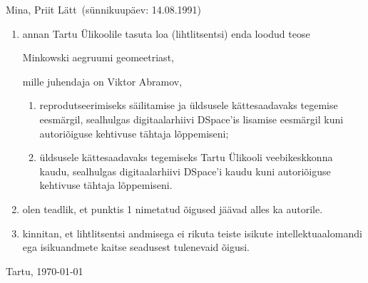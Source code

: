 \documentclass[12pt,a4paper,oneside]{article}
\theoremstyle{plain}
\theoremstyle{definition}
\numberwithin{equation}{section}
\def\title{Minkowski aegruumi geomeetriast}
\def\author{Priit Lätt}
\begin{document}
Mina, \author\ (sünnikuupäev: 14.08.1991)
\begin{enumerate}
	\item annan Tartu Ülikoolile tasuta loa (lihtlitsentsi) 
	enda loodud teose
	\begin{center}
	\title,
	\end{center}
	mille juhendaja on Viktor Abramov,
	\begin{enumerate}
		\item reprodutseerimiseks säilitamise ja üldsusele 
		kättesaadavaks tegemise eesmärgil, sealhulgas 
		digitaalarhiivi DSpace'is lisamise eesmärgil kuni 
		autoriõiguse kehtivuse tähtaja lõppemiseni;
		\item üldsusele kättesaadavaks tegemiseks Tartu Ülikooli 
		veebikeskkonna kaudu, sealhulgas digitaalarhiivi 
		DSpace'i kaudu kuni autoriõiguse kehtivuse tähtaja lõppemiseni.
	\end{enumerate}
	\item olen teadlik, et punktis 1 nimetatud õigused jäävad 
	alles ka autorile.
	\item kinnitan, et lihtlitsentsi andmisega ei rikuta teiste 
	isikute intellektuaalomandi ega isikuandmete kaitse 
	seadusest tulenevaid õigusi.
\end{enumerate}

\vfill

\begin{center}
Tartu, \ddmmyyyydate \today
\end{center}
\end{document}
